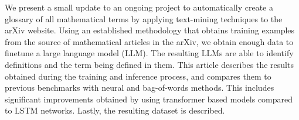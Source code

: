 We present a small update to an ongoing project to automatically create a glossary of all mathematical terms by applying text-mining techniques to the arXiv website. Using an established methodology that obtains training examples from the \latex source of mathematical articles in the arXiv, we obtain enough data to finetune a large language model (LLM). The resulting LLMs are able to identify definitions and the term being defined in them.  This article describes the results obtained during the training and inference process, and compares them to previous benchmarks with neural and bag-of-words methods. This includes  significant improvements obtained by using transformer based models compared to LSTM networks. Lastly, the resulting dataset is described. 

